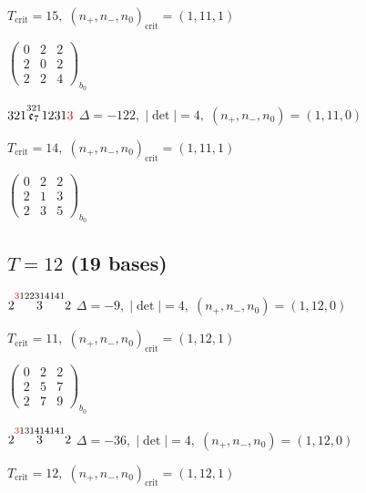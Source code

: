 \documentclass[10pt]{article}
\begin{document}
\hspace{1em}$T_{\text{crit}}=15,\; (n_+,n_-,n_0)_{\text{crit}}=(1,11,1)$

\hspace{2em}$\left(\begin{smallmatrix}0 & 2 & 2 \\ 2 & 0 & 2 \\ 2 & 2 & 4\end{smallmatrix}\right)_{\!b_0}$

\smallskip

$321\overset{321}{\mathfrak{e}_7}1231\textcolor{red}{3}$ \quad $\Delta=-122,\; |\det|=4,\; (n_+,n_-,n_0)=(1,11,0)$

\hspace{1em}$T_{\text{crit}}=14,\; (n_+,n_-,n_0)_{\text{crit}}=(1,11,1)$

\hspace{2em}$\left(\begin{smallmatrix}0 & 2 & 2 \\ 2 & 1 & 3 \\ 2 & 3 & 5\end{smallmatrix}\right)_{\!b_0}$


\subsection*{$T = 12$ \quad (19 bases)}
\smallskip

$2\overset{\textcolor{red}{3}122314141}{3}2$ \quad $\Delta=-9,\; |\det|=4,\; (n_+,n_-,n_0)=(1,12,0)$

\hspace{1em}$T_{\text{crit}}=11,\; (n_+,n_-,n_0)_{\text{crit}}=(1,12,1)$

\hspace{2em}$\left(\begin{smallmatrix}0 & 2 & 2 \\ 2 & 5 & 7 \\ 2 & 7 & 9\end{smallmatrix}\right)_{\!b_0}$

\smallskip

$2\overset{\textcolor{red}{3}131414141}{3}2$ \quad $\Delta=-36,\; |\det|=4,\; (n_+,n_-,n_0)=(1,12,0)$

\hspace{1em}$T_{\text{crit}}=12,\; (n_+,n_-,n_0)_{\text{crit}}=(1,12,1)$
\end{document}
